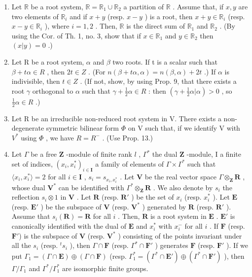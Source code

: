 \begin{enumerate}
\def\labelenumi{\arabic{enumi})}
\item
  Let \(\mathbb{R}\) be a root system, \(\mathbb{R} = \mathbb{R}_1 \cup \mathbb{R}_2\) a partition of \(\mathbb{R}\) . Assume that, if \(x, y\) are two elements of \(\mathbb{R}_i\) and if \(x + y\) (resp. \(x - y\) ) is a root, then \(x + y \in \mathbb{R}_i\) (resp. \(x - y \in \mathbb{R}_i\) ), where \(i = 1, 2\) . Then, \(\mathbb{R}\) is the direct sum of \(\mathbb{R}_1\) and \(\mathbb{R}_2\) . (By using the Cor. of Th. 1, no. 3, show that if \(x \in \mathbb{R}_1\) and \(y \in \mathbb{R}_2\) then \((x|y) = 0\) .)
\item
  Let R be a root system, \(\alpha\) and \(\beta\) two roots. If t is a scalar such that \(\beta + t\alpha \in R\) , then \(2t \in Z\) . (For \(n(\beta + t\alpha, \alpha) = n(\beta, \alpha) + 2t\) .) If \(\alpha\) is indivisible, then \(t \in Z\) . (If not, show, by using Prop. 9, that there exists a root \(\gamma\) orthogonal to \(\alpha\) such that \(\gamma + \frac{1}{2}\alpha \in R\) : then \((\gamma + \frac{1}{2}\alpha|\alpha) > 0\) , so \(\frac{1}{2}\alpha \in R\) .)
\item
  Let R be an irreducible non-reduced root system in V. There exists a non-degenerate symmetric bilinear form \(\Phi\) on V such that, if we identify V with \(V^{*}\) using \(\Phi\) , we have \(R = R^{-}\) . (Use Prop. 13.)
\item
  Let \(\Gamma\) be a free \(\mathbf{Z}\) -module of finite rank \(l\) , \(\Gamma^{*}\) the dual \(\mathbf{Z}\) -module, I a finite set of indices, \((x_{i}, x_{i}^{*})_{i \in \mathbf{I}}\) a family of elements of \(\Gamma \times \Gamma^{*}\) such that \(\langle x_{i}, x_{i}^{*} \rangle = 2\) for all \(i \in \mathbf{I}\) , \(s_{i} = s_{x_{i}, x_{i}^{*}}\) . Let \(\mathbf{V}\) be the real vector space \(\Gamma \otimes_{\mathbf{Z}} \mathbf{R}\) , whose dual \(\mathbf{V}^{*}\) can be identified with \(\Gamma^{*} \otimes_{\mathbf{Z}} \mathbf{R}\) . We also denote by \(s_{i}\) the reflection \(s_{i} \otimes 1\) in \(\mathbf{V}\) . Let \(\mathbf{R}\) (resp. \(\mathbf{R}'\) ) be the set of \(x_{i}\) (resp. \(x_{i}^{*}\) ). Let \(\mathbf{E}\) (resp. \(\mathbf{E}'\) ) be the subspace of \(\mathbf{V}\) (resp. \(\mathbf{V}^{*}\) ) generated by \(\mathbf{R}\) (resp. \(\mathbf{R}'\) ). Assume that \(s_{i}(\mathbf{R}) = \mathbf{R}\) for all \(i\) . Then, \(\mathbf{R}\) is a root system in \(\mathbf{E}\) . \(\mathbf{E}'\) is canonically identified with the dual of \(\mathbf{E}\) and \(x_{i}^{*}\) with \(x_{i}^{-}\) for all \(i\) . If \(\mathbf{F}\) (resp. \(\mathbf{F}'\)) is the subspace of \(\mathbf{V}\) (resp. \(\mathbf{V}^{*}\) ) consisting of the points invariant under all the \(s_{i}\) (resp. \(^t s_{i}\) ), then \(\Gamma \cap \mathbf{F}\) (resp. \(\Gamma^{*} \cap \mathbf{F}'\) ) generates \(\mathbf{F}\) (resp. \(\mathbf{F}'\) ). If we put \(\Gamma_{1} = (\Gamma \cap \mathbf{E}) \oplus (\Gamma \cap \mathbf{F})\) (resp. \(\Gamma_{1}^{*} = (\Gamma^{*} \cap \mathbf{E}') \oplus (\Gamma^{*} \cap \mathbf{F}')\) ), then \(\Gamma / \Gamma_{1}\) and \(\Gamma^{*} / \Gamma_{1}^{*}\) are isomorphic finite groups.

\end{enumerate}
